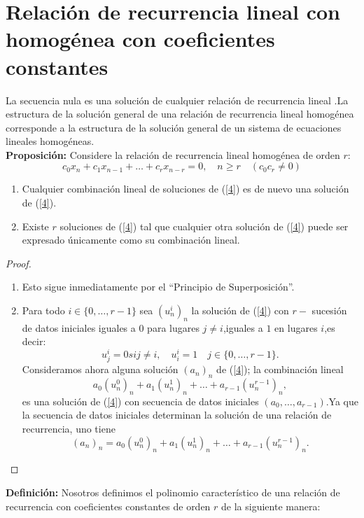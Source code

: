 \section{Relación de recurrencia lineal con homogénea con coeficientes constantes}
La secuencia nula es una solución de cualquier relación de recurrencia lineal .La estructura de la solución general de una relación de recurrencia lineal homogénea corresponde a la estructura de la solución general de un sistema de ecuaciones lineales homogéneas.\\
{\bf Proposición:}
Considere la relación de recurrencia lineal homogénea de orden $ r $:
\begin{equation}\label{4}
c_{0}x_{n}+c_{1}x_{n-1}+\ldots+c_{r}x_{n-r}=0,\quad n \geq r \quad (c_{0}c_{r} \neq 0)
\end{equation}
\begin{enumerate}
	\item Cualquier combinación lineal de soluciones de (\ref{4}) es de nuevo una solución de (\ref{4}).
	\item Existe $ r $ soluciones de (\ref{4}) tal que cualquier otra solución de (\ref{4}) puede ser expresado únicamente como su combinación lineal.
\end{enumerate}
\begin{proof}
	\begin{enumerate}
		\item  Esto sigue inmediatamente por el ``Principio de Superposición''.
		\item Para todo $ i \in \{0,\ldots,r-1 \}$ sea $ (u^{i}_{n})_{n} $ la solución de (\ref{4}) con 
		$ r - $ sucesión de datos iniciales iguales a $ 0$ para lugares $ j\neq i $,iguales a $ 1 $ en lugares $ i $,es decir:
		$$
		u^{i}_{j}=0 si j\neq i , \quad u^{i}_{i}=1 \quad  j \in \{0,\ldots,r-1 \}.
		$$
		Consideramos ahora  alguna solución $ (a_{n})_{n} $ de (\ref{4}); la combinación lineal 
		$$
		a_{0}(u^{0}_{n})_{n}+a_{1}(u^{1}_{n})_{n}+\ldots+a_{r-1}(u^{r-1}_{n})_{n},
		$$
		es una solución de (\ref{4}) con secuencia de datos iniciales $ (a_{0},\ldots,a_{r-1}) $.Ya que la secuencia de datos iniciales determinan la solución de una relación de recurrencia, uno tiene
		$$
		(a_{n})_{n}=a_{0}(u^{0}_{n})_{n}+a_{1}(u^{1}_{n})_{n}+\ldots+a_{r-1}(u^{r-1}_{n})_{n}.
		$$
	\end{enumerate}
\end{proof}
{\bf Definición:} Nosotros definimos el polinomio característico de una relación de recurrencia con coeficientes constantes de orden $ r $ de la siguiente manera:
